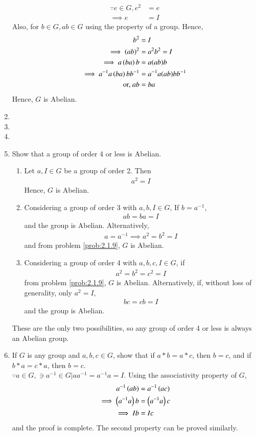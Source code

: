 \begin{enumerate}[label=\arabic*.,ref=\thesubsection.\theenumi]
	\solution 
\begin{align}
	\because e \in G, e^2 &= e	
	\\
	\implies e &=I
\end{align}
Also, for $b \in G, ab \in G$ using the property of a group.  Hence, 
\begin{align}
 b^2 &= I
	\\
	\implies \left(ab\right)^2 &=a^2b^2=I
	\\
	\implies a\left(ba\right)b &= a(ab)b
	\\
	\implies a^{-1}a\left(ba\right)bb^{-1} &= a^{-1}a(ab)bb^{-1}
\\
	\text{or, } ab &=ba
\end{align}
Hence, $G$ is Abelian.
\item 
\item 
\item 
\item Show that a group of order 4 or less is Abelian.
	\\
	\solution 
	\begin{enumerate}
		\item Let $a,I \in G$ be a group of order 2. Then
			\begin{align}
				a^2 = I
			\end{align}
			Hence, $G$ is Abelian.
		\item Considering a group of order 3 with $a,b,I \in G$, 
			If $b = a^{-1}$,
			\begin{align}
				ab = ba = I
			\end{align}
			and the group is Abelian.  Alternatively, 
			\begin{align}
				a = a^{-1} \implies a^2 = b^2 = I
			\end{align}
			and from problem  
	\ref{prob:2.1.9}, $G$ is Abelian.
\item Considering a group of order 4 with $a, b, c, I \in G$, if 
			\begin{align}
				 a^2 = b^2 = c^2 = I
			\end{align}
			from problem  
	\ref{prob:2.1.9}, $G$ is Abelian. Alternatively, if, without loss of generality, only $a^2=I$, 
			\begin{align}
				 bc = cb = I
			\end{align}
			and the group is Abelian.  
	\end{enumerate}
These are the only two possibilities, so any group of order 4 or less is always an Abelian group.
\item
	If $G$ is any group and $a, b, c \in G$, show that if $a * b = a * c$, then $b = c$, and if $b * a = c * a$, then $b = c$.
	\\
	\solution $\because a \in G, \ni a^{-1} \in G | aa^{-1} = a^{-1}a = I$.  Using the associativity property of $G$,  
			\begin{align}
				a^{-1}\left(ab\right)
				&=
				a^{-1}\left(ac\right)
				\\
				\implies 
				\left(a^{-1}a\right)b
				&=
				\left(a^{-1}a\right)c
				\\
				\implies Ib &= Ic
			\end{align}
			and the proof is complete.  The second property can be proved similarly.

\end{enumerate}
